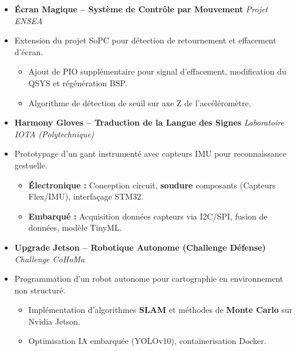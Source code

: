 \documentclass[a4paper,11pt]{article}
\begin{document}
\begin{itemize}[leftmargin=*, label={}]
\item \textbf{Écran Magique -- Système de Contrôle par Mouvement} \hfill \textit{Projet ENSEA}
\vspace{-2pt}
\item \small{Extension du projet SoPC pour détection de retournement et effacement d'écran.}
    \begin{itemize}[leftmargin=0.4cm, nosep, label=\tiny$\bullet$]
        \item \small{Ajout de PIO supplémentaire pour signal d'effacement, modification du QSYS et régénération BSP.}
        \item \small{Algorithme de détection de seuil sur axe Z de l'accéléromètre.}
    \end{itemize}
    \vspace{3pt}

\item \textbf{Harmony Gloves -- Traduction de la Langue des Signes} \hfill \textit{Laboratoire IOTA (Polytechnique)}
\vspace{-2pt}
\item \small{Prototypage d'un gant instrumenté avec capteurs IMU pour reconnaissance gestuelle.}
    \begin{itemize}[leftmargin=0.4cm, nosep, label=\tiny$\bullet$]
        \item \small{\textbf{Électronique :} Conception circuit, \textbf{soudure} composants (Capteurs Flex/IMU), interfaçage STM32.}
        \item \small{\textbf{Embarqué :} Acquisition données capteurs via I2C/SPI, fusion de données, modèle TinyML.}
    \end{itemize}
    \vspace{3pt}

\item \textbf{Upgrade Jetson -- Robotique Autonome (Challenge Défense)} \hfill \textit{Challenge CoHoMa}
\vspace{-2pt}
\item \small{Programmation d'un robot autonome pour cartographie en environnement non structuré.}
    \begin{itemize}[leftmargin=0.4cm, nosep, label=\tiny$\bullet$]
        \item \small{Implémentation d'algorithmes \textbf{SLAM} et méthodes de \textbf{Monte Carlo} sur Nvidia Jetson.}
        \item \small{Optimisation IA embarquée (YOLOv10), containerisation Docker.}
    \end{itemize}
    \vspace{3pt}


\end{itemize}
\end{document}
